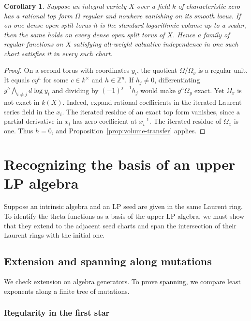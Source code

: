 \documentclass[11pt,reqno]{amsart}
\numberwithin{equation}{section}
\newtheorem{corollary}[theorem]{Corollary}
\theoremstyle{definition}
\theoremstyle{remark}
\begin{document}
\begin{corollary}\label{cor:open-torus-volume-transfer}
Suppose an integral variety \(X\) over a field \(k\) of characteristic
zero has a rational top form
\(\Omega\) regular and nowhere vanishing on its smooth locus. If on
one dense open split torus it is the standard logarithmic volume up
to a scalar, then the same holds on every dense open split torus
of \(X\). Hence a family of regular functions on \(X\) satisfying
all-weight valuative independence in one such chart satisfies it
in every such chart.
\end{corollary}

\begin{proof}
On a second torus with coordinates \(y_i\), the quotient
\(\Omega/\Omega_y\) is a regular unit. It equals \(c y^h\) for
some \(c\in k^\times\) and \(h\in\mathbb Z^n\). If \(h_j\ne0\),
differentiating
\(y^h\bigwedge_{i\ne j}d\log y_i\) and dividing by
\((-1)^{j-1}h_j\) would make \(y^h\Omega_y\) exact. Yet \(\Omega_x\) is not exact in \(k(X)\).
Indeed, expand rational coefficients in the iterated Laurent series
field in the \(x_i\). The iterated residue of an exact top form vanishes, since a partial
derivative in \(x_i\) has zero coefficient at \(x_i^{-1}\). The
iterated residue of \(\Omega_x\) is one.
Thus \(h=0\), and Proposition~\ref{prop:volume-transfer} applies.
\end{proof}

\section{Recognizing the basis of an upper LP algebra}
\label{sec:star-recognition}

Suppose an intrinsic algebra and an LP seed are given in the same
Laurent ring. To identify the theta functions as a basis of the upper
LP algebra, we must show that they extend to the adjacent seed charts
and span the intersection of their Laurent rings with the initial one.

\subsection{Extension and spanning along mutations}

We check extension on algebra generators. To prove spanning, we
compare least exponents along a finite tree of mutations.

\subsubsection{Regularity in the first star}
\end{document}
